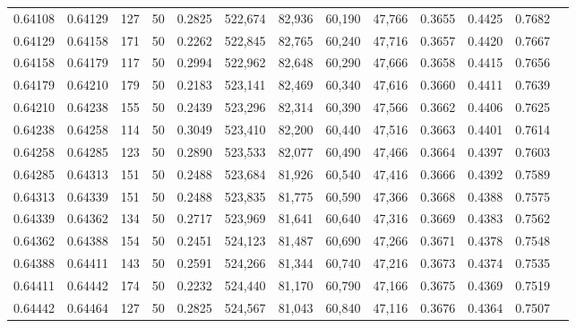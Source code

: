 \begin{tabular}{rrrrrrrrrrrrr}
0.64108 & 0.64129 &   127 &  50 &                                     0.2825 & 522,674 &  82,936 &  60,190 &  47,766 & 0.3655 & 0.4425 & 0.7682 \\
0.64129 & 0.64158 &   171 &  50 &                                     0.2262 & 522,845 &  82,765 &  60,240 &  47,716 & 0.3657 & 0.4420 & 0.7667 \\
0.64158 & 0.64179 &   117 &  50 &                                     0.2994 & 522,962 &  82,648 &  60,290 &  47,666 & 0.3658 & 0.4415 & 0.7656 \\
0.64179 & 0.64210 &   179 &  50 &                                     0.2183 & 523,141 &  82,469 &  60,340 &  47,616 & 0.3660 & 0.4411 & 0.7639 \\
0.64210 & 0.64238 &   155 &  50 &                                     0.2439 & 523,296 &  82,314 &  60,390 &  47,566 & 0.3662 & 0.4406 & 0.7625 \\
0.64238 & 0.64258 &   114 &  50 &                                     0.3049 & 523,410 &  82,200 &  60,440 &  47,516 & 0.3663 & 0.4401 & 0.7614 \\
0.64258 & 0.64285 &   123 &  50 &                                     0.2890 & 523,533 &  82,077 &  60,490 &  47,466 & 0.3664 & 0.4397 & 0.7603 \\
0.64285 & 0.64313 &   151 &  50 &                                     0.2488 & 523,684 &  81,926 &  60,540 &  47,416 & 0.3666 & 0.4392 & 0.7589 \\
0.64313 & 0.64339 &   151 &  50 &                                     0.2488 & 523,835 &  81,775 &  60,590 &  47,366 & 0.3668 & 0.4388 & 0.7575 \\
0.64339 & 0.64362 &   134 &  50 &                                     0.2717 & 523,969 &  81,641 &  60,640 &  47,316 & 0.3669 & 0.4383 & 0.7562 \\
0.64362 & 0.64388 &   154 &  50 &                                     0.2451 & 524,123 &  81,487 &  60,690 &  47,266 & 0.3671 & 0.4378 & 0.7548 \\
0.64388 & 0.64411 &   143 &  50 &                                     0.2591 & 524,266 &  81,344 &  60,740 &  47,216 & 0.3673 & 0.4374 & 0.7535 \\
0.64411 & 0.64442 &   174 &  50 &                                     0.2232 & 524,440 &  81,170 &  60,790 &  47,166 & 0.3675 & 0.4369 & 0.7519 \\
0.64442 & 0.64464 &   127 &  50 &                                     0.2825 & 524,567 &  81,043 &  60,840 &  47,116 & 0.3676 & 0.4364 & 0.7507 \\

\end{tabular}

